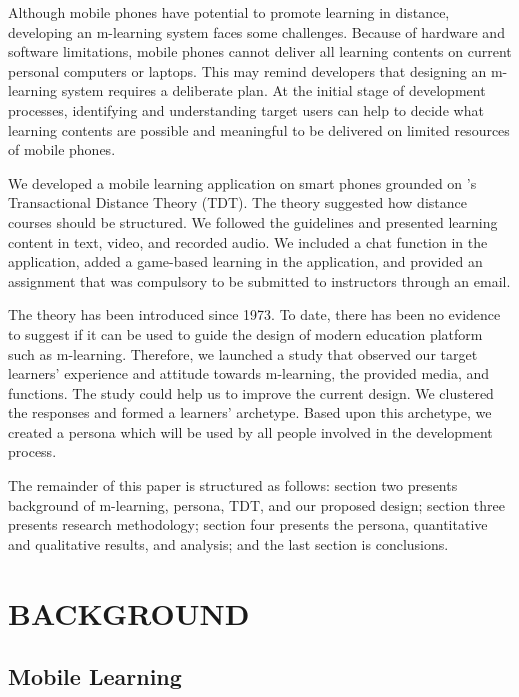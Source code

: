 \documentclass[a4paper,twoside]{article}
\begin{document}
Although mobile phones have potential to promote learning in distance, developing an m-learning system faces some challenges. Because of hardware and software limitations, mobile phones cannot deliver all learning contents on current personal computers or laptops. This may remind developers that designing an m-learning system requires a deliberate plan. At the initial stage of development processes, identifying and understanding target users can help to decide what learning contents are possible and meaningful to be delivered on limited resources of mobile phones. 

We developed a mobile learning application on smart phones grounded on \citet{moore1973toward}'s Transactional Distance Theory (TDT). The theory suggested how distance courses should be structured. We followed the guidelines and presented learning content in text, video, and recorded audio. We included a chat function in the application, added a game-based learning in the application, and provided an assignment that was compulsory to be submitted to instructors through an email. 

The theory has been introduced since 1973. To date, there has been no evidence to suggest if it can be used to guide the design of modern education platform such as m-learning. Therefore, we launched a study that observed our target learners' experience and attitude towards m-learning, the provided media, and functions. The study could help us to improve the current design. We clustered the responses and formed a learners' archetype. Based upon this archetype, we created a persona which will be used by all people involved in the development process. 

The remainder of this paper is structured as follows: section two presents background of m-learning, persona, TDT, and our proposed design; section three presents research methodology; section four presents the persona, quantitative and qualitative results, and analysis; and the last section is conclusions. 



\section{\uppercase{Background}}

\subsection{Mobile Learning}
\end{document}
